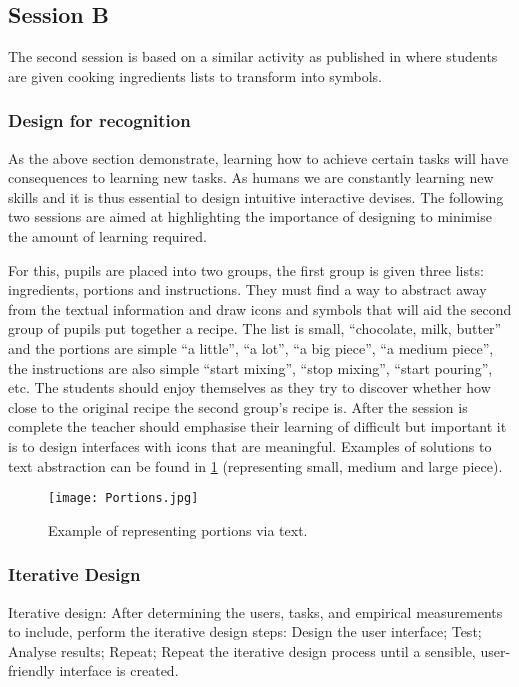 \documentclass{sig-alternate}
\begin{document}
\subsection{Session B}

The second session is based on a similar activity as published in
\cite{fellows2005} where students are given cooking ingredients lists
to transform into symbols.

\subsubsection*{Design for recognition}
 
As the above section demonstrate, learning how to achieve certain
tasks will have consequences to learning new tasks. As humans we are
constantly learning new skills and it is thus essential to design
intuitive interactive devises. The following two sessions are aimed at
highlighting the importance of designing to minimise the amount of
learning required.

For this, pupils are placed into two groups, the first group is given
three lists: ingredients, portions and instructions. They must find a
way to abstract away from the textual information and draw icons and
symbols that will aid the second group of pupils put together a
recipe. The list is small, ``chocolate, milk, butter'' and the portions
are simple ``a little'', ``a lot'', ``a big piece'', ``a medium piece'', the
instructions are also simple ``start mixing'', ``stop mixing'', ``start
pouring'', etc. The students should enjoy themselves as they try to
discover whether how close to the original recipe the second group's
recipe is. After the session is complete the teacher should emphasise
their learning of difficult but important it is to design interfaces
with icons that are meaningful. Examples of solutions to text
abstraction can be found in \ref{fig1} (representing small, medium
and large piece).


\begin{figure}
  \texttt{[image: Portions.jpg]}
  \caption{Example of representing portions via text.}\label{fig1}
\end{figure}

\subsubsection*{Iterative Design}

Iterative design: After determining the users, tasks, and empirical
measurements to include, perform the iterative design steps:
Design the user interface; Test; Analyse results; Repeat; Repeat the iterative design process until a sensible, user-friendly interface is
created.
\end{document}

